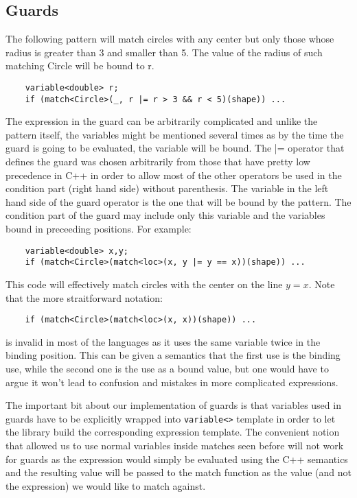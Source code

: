 \documentclass[preprint]{sigplanconf}
\DeclareRobustCommand{\code}[1]{{\lstinline[breaklines=false]{#1}}}
\begin{document}
\subsection{Guards}

The following pattern will match circles with any center but only those whose 
radius is greater than 3 and smaller than 5. The value of the radius of such 
matching Circle will be bound to r.

\begin{lstlisting}
    variable<double> r;
    if (match<Circle>(_, r |= r > 3 && r < 5)(shape)) ...
\end{lstlisting}

The expression in the guard can be arbitrarily complicated and unlike the 
pattern itself, the variables might be mentioned several times as by the time 
the guard is going to be evaluated, the variable will be bound. The |= operator 
that defines the guard was chosen arbitrarily from those that have pretty low 
precedence in C++ in order to allow most of the other operators be used in the 
condition part (right hand side) without parenthesis. The variable in the left 
hand side of the guard operator is the one that will be bound by the pattern. 
The condition part of the guard may include only this variable and the variables 
bound in preceeding positions. For example:

\begin{lstlisting}
    variable<double> x,y;
    if (match<Circle>(match<loc>(x, y |= y == x))(shape)) ...
\end{lstlisting}

This code will effectively match circles with the center on the line $y=x$. Note 
that the more straitforward notation:

\begin{lstlisting}
    if (match<Circle>(match<loc>(x, x))(shape)) ...
\end{lstlisting}

is invalid in most of the languages as it uses the same variable twice in the 
binding position. This can be given a semantics that the first use is the 
binding use, while the second one is the use as a bound value, but one would 
have to argue it won't lead to confusion and mistakes in more complicated 
expressions.

The important bit about our implementation of guards is that variables used in 
guards have to be explicitly wrapped into \code{variable<>} template in order to let 
the library build the corresponding expression template. The convenient notion 
that allowed us to use normal variables inside matches seen before will not work 
for guards as the expression would simply be evaluated using the C++ semantics 
and the resulting value will be passed to the match function as the value (and 
not the expression) we would like to match against.
\end{document}
